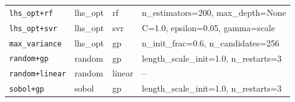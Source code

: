 \begin{table}[htbp]
\begin{tabular}{@{}llll@{}}
\texttt{lhs\_opt+rf} & lhs\_opt & rf & n\_estimators=200, max\_depth=None \\
\texttt{lhs\_opt+svr} & lhs\_opt & svr & C=1.0, epsilon=0.05, gamma=scale \\
\texttt{max\_variance} & lhs\_opt & gp & n\_init\_frac=0.6, n\_candidates=256 \\
\texttt{random+gp} & random & gp & length\_scale\_init=1.0, n\_restarts=3 \\
\texttt{random+linear} & random & linear & -- \\
\texttt{sobol+gp} & sobol & gp & length\_scale\_init=1.0, n\_restarts=3 \\
\bottomrule
\end{tabular}
\end{table}
